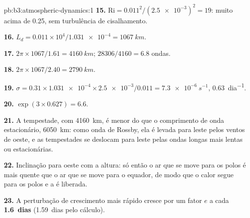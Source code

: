 \begin{solution}{pb:b3:atmospheric-dynamics:1}
\textbf{15.} $\mathrm{Ri} = 0.011^2/(\num{2.5e-3})^2 = 19$: muito acima de 0.25,
sem turbulência de cisalhamento.

\textbf{16.} $L_d = 0.011\times10^4/\num{1.031e-4} = \qty{1067}{km}$.

\textbf{17.} $2\pi\times1067/1.61 = \qty{4160}{km}$; $28306/4160 = 6.8$
ondas.

\textbf{18.} $2\pi\times1067/2.40 = \qty{2790}{km}$.

\textbf{19.} $\sigma = 0.31\times\num{1.031e-4}\times\num{2.5e-3}/0.011 =
\qty{7.3e-6}{s^{-1}}$, \qty{0.63}{dia^{-1}}.

\textbf{20.} $\exp(3\times0.627) = 6.6$.

\textbf{21.} A tempestade, com \qty{4160}{km}, é menor do que o comprimento de
onda estacionário, \qty{6050}{km}: como onda de Rossby, ela é levada para leste
pelos ventos de oeste, e as tempestades se deslocam para leste pelas ondas
longas mais lentas ou estacionárias.

\textbf{22.} Inclinação para oeste com a altura: só então o ar que se move para os polos é
mais quente que o ar que se move para o equador, de modo que o calor segue para os polos e a
 é liberada.

\textbf{23.} A perturbação de crescimento mais rápido cresce por um fator $e$ a cada
\textbf{\num[text-series-to-math=true]{1.6}~dias} (\num{1.59}~dias pelo
cálculo).
\end{solution}
